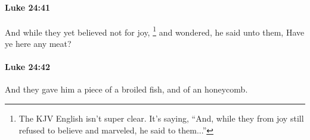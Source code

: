 		\paragraph{Luke 24:41} %
			\label{LUKE-24-41}

			And while they yet believed not for joy,%
				\footnote{%
					The KJV English isn't super clear. It's saying, ``And, while they from joy still refused to believe and marveled, he said to them...''
					}
			and wondered, he said unto them, Have ye here any meat?

			\begin{framed}
			\scriptsize
				\begin{compactdesc}
					\item[SBLG] 
				\end{compactdesc}
			\end{framed}

		\paragraph{Luke 24:42} %
			\label{LUKE-24-42}

			And they gave him a piece of a broiled fish, and of an honeycomb.

